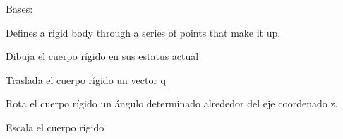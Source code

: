 \documentclass[letterpaper,10pt,english]{sphinxmanual}
\begin{document}

\begin{fulllineitems}
\label{\detokenize{_src/didactic:rkd.didactic.core.RigidBody2D}}
Bases: 

Defines a rigid body through a series of points that 
make it up.

\begin{fulllineitems}
\label{\detokenize{_src/didactic:rkd.didactic.core.RigidBody2D.draw}}
Dibuja el cuerpo rígido en sus estatus actual

\end{fulllineitems}


\begin{fulllineitems}
\label{\detokenize{_src/didactic:rkd.didactic.core.RigidBody2D.move}}
Traslada el cuerpo rígido un vector q

\end{fulllineitems}


\begin{fulllineitems}
\label{\detokenize{_src/didactic:rkd.didactic.core.RigidBody2D.rotate}}
Rota el cuerpo rígido un ángulo determinado alrededor 
del eje coordenado z.

\end{fulllineitems}


\begin{fulllineitems}
\label{\detokenize{_src/didactic:rkd.didactic.core.RigidBody2D.scale}}
Escala el cuerpo rígido

\end{fulllineitems}


\end{fulllineitems}
\end{document}
